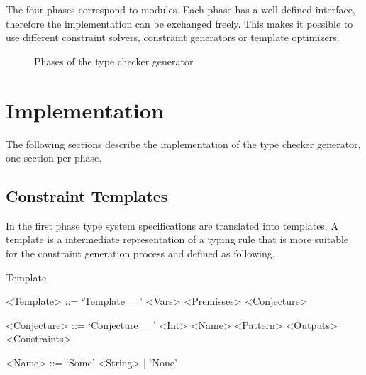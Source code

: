 The four phases correspond to modules. Each phase has a well-defined
interface, therefore the implementation can be exchanged freely. This
makes it possible to use different constraint solvers, constraint
generators or template optimizers.

\begin{figure}
\caption{Phases of the type checker generator}
\label{fig:phases}
\end{figure}
\section{Implementation}
\label{sec:implementation}
The following sections describe the implementation of the type checker
generator, one section per phase.

\subsection{Constraint Templates}
\label{sec:constraint-templates}
In the first phase type system specifications are translated into
templates. A template is a intermediate representation of a typing
rule that is more suitable for the constraint generation process and
defined as following.

\begin{definition}{Template}
  \begin{grammar}
    <Template> ::= `Template__' <Vars> <Premisses> <Conjecture>

    <Conjecture> ::= `Conjecture__' <Int> <Name> <Pattern> <Outputs> <Constraints>

    <Name> ::= `Some' <String> | `None'
  \end{grammar}
\end{definition}

